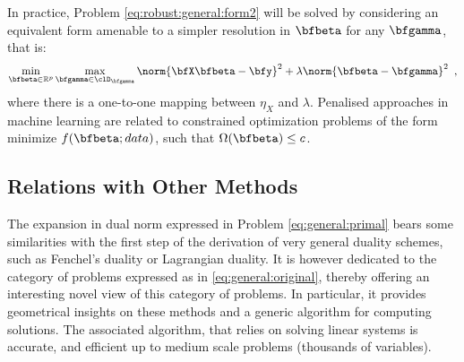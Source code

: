 In practice, Problem \eqref{eq:robust:general:form2} will be solved by
considering an equivalent form amenable to a simpler resolution in
$\bfbeta$ for any $\bfgamma$, that is:
%
\begin{equation}\label{eq:general:dual}
  \min_{\bfbeta\in\mathbb{R}^p} \max_{\bfgamma \in \clD_{\bfgamma}}
    \norm{\bfX \bfbeta - \bfy}^2 + \lambda \norm{\bfbeta - \bfgamma}^2
  \enspace,
\end{equation}
where there is a one-to-one mapping between $\eta_X$ and $\lambda$.
%
Penalised approaches in machine learning are related to constrained optimization
problems of the form minimize $f (\bfbeta; data)$, such that $\Omega(\bfbeta)
\leq c$.

\subsection{Relations with Other Methods}

The expansion in dual norm expressed in Problem \eqref{eq:general:primal} bears
some similarities with the first step of the derivation of very general duality
schemes, such as Fenchel's duality or Lagrangian duality.
It is however dedicated to the category of problems expressed as in
\eqref{eq:general:original}, thereby offering an interesting novel view of this
category of problems.
In particular, it provides geometrical insights on these methods and a generic
algorithm for computing solutions.  The associated algorithm, that relies on
solving linear systems is accurate, and efficient up to medium scale problems
(thousands of variables).


%  


